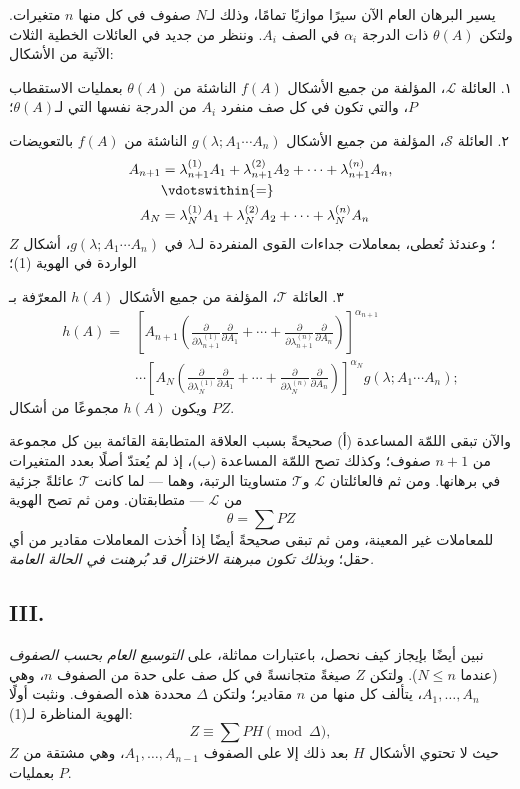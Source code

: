 \documentclass[11pt]{article}
\begin{document}
يسير البرهان العام الآن سيرًا موازيًا تمامًا، وذلك لـ$N$ صفوف في كل منها $n$ متغيرات. ولتكن $\theta(A)$ ذات الدرجة $\alpha_i$ في الصف $A_i$. وننظر من جديد في العائلات الخطية الثلاث الآتية من الأشكال:

١. العائلة $\mathcal L$، المؤلفة من جميع الأشكال $f(A)$ الناشئة من $\theta(A)$ بعمليات الاستقطاب $P$، والتي تكون في كل صف منفرد $A_i$ من الدرجة نفسها التي لـ$\theta(A)$؛

٢. العائلة $\mathcal S$، المؤلفة من جميع الأشكال $g(\lambda;A_1\cdots A_n)$ الناشئة من $f(A)$ بالتعويضات
\[
\begin{aligned}
 A_{n+1}&=\lambda_{n+1}^{(1)}A_1+\lambda_{n+1}^{(2)}A_2+
        \cdots+\lambda_{n+1}^{(n)}A_n,\\
 &\vdotswithin{=}\\
 A_N&=\lambda_N^{(1)}A_1+\lambda_N^{(2)}A_2+
        \cdots+\lambda_N^{(n)}A_n
\end{aligned}
\]
؛ وعندئذ تُعطى، بمعاملات جداءات القوى المنفردة لـ$\lambda$ في $g(\lambda;A_1\cdots A_n)$، أشكال $Z$ الواردة في الهوية (1)؛

٣. العائلة $\mathcal T$، المؤلفة من جميع الأشكال $h(A)$ المعرّفة بـ
\[
\begin{aligned}
 h(A)=&\left[A_{n+1}\left(
 \frac{\partial}{\partial\lambda_{n+1}^{(1)}}\frac{\partial}{\partial A_1}
 +\cdots+
 \frac{\partial}{\partial\lambda_{n+1}^{(n)}}\frac{\partial}{\partial A_n}\right)\right]^{\alpha_{n+1}} \\
&\cdots
\left[A_N\left(
 \frac{\partial}{\partial\lambda_N^{(1)}}\frac{\partial}{\partial A_1}
 +\cdots+
 \frac{\partial}{\partial\lambda_N^{(n)}}\frac{\partial}{\partial A_n}\right)\right]^{\alpha_N}
 g(\lambda;A_1\cdots A_n);
\end{aligned}
\]
ويكون $h(A)$ مجموعًا من أشكال $PZ$.

والآن تبقى اللمّة المساعدة (أ) صحيحةً بسبب العلاقة المتطابقة القائمة بين كل مجموعة من $n+1$ صفوف؛ وكذلك تصح اللمّة المساعدة (ب)، إذ لم يُعتدّ أصلًا بعدد المتغيرات في برهانها. ومن ثم فالعائلتان $\mathcal L$ و$\mathcal T$ متساويتا الرتبة، وهما — لما كانت $\mathcal T$ عائلةً جزئية من $\mathcal L$ — متطابقتان. ومن ثم تصح الهوية
\[
  \theta=\sum PZ
\]
للمعاملات غير المعينة، ومن ثم تبقى صحيحةً أيضًا إذا أُخذت المعاملات مقادير من أي حقل؛ \emph{وبذلك تكون مبرهنة الاختزال قد بُرهنت في الحالة العامة.}

\subsection*{III.}
نبين أيضًا بإيجاز كيف نحصل، باعتبارات مماثلة، على \emph{التوسيع العام بحسب الصفوف} (عندما $N\le n$). ولتكن $Z$ صيغةً متجانسةً في كل صف على حدة من الصفوف $n$، وهي $A_1,
\ldots,A_n$، يتألف كل منها من $n$ مقادير؛ ولتكن $\Delta$ محددة هذه الصفوف. ونثبت أولًا الهوية المناظرة لـ(1):
\begin{equation}
  Z\equiv\sum PH \pmod{\Delta},
\tag{2}
\end{equation}
حيث لا تحتوي الأشكال $H$ بعد ذلك إلا على الصفوف $A_1,\ldots,A_{n-1}$، وهي مشتقة من $Z$ بعمليات $P$.
\end{document}
